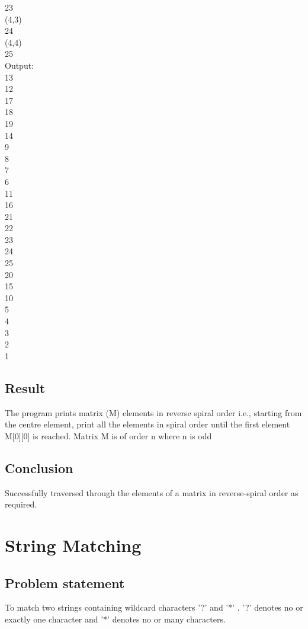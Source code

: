 \documentclass[paper=a4, fontsize=11pt]{scrartcl} %
\numberwithin{equation}{section} %
\numberwithin{figure}{section} %
\numberwithin{table}{section} %
\begin{document}
23\\
(4,3)\\
24\\
(4,4)\\
25\\
Output:\\
13\\
12\\
17\\
18\\
19\\
14\\
9\\
8\\
7\\
6\\
11\\
16\\
21\\
22\\
23\\
24\\
25\\
20\\
15\\
10\\
5\\
4\\
3\\
2\\
1\\


\subsection{Result}
The program prints matrix (M) elements in reverse spiral order i.e., starting from the centre element, print all the elements in spiral order until the first element M[0][0] is reached. Matrix M is of order n where n is odd

\subsection{Conclusion}
Successfully traversed through the elements of a matrix in reverse-spiral order as required.

\section{String Matching}

\subsection{Problem statement}
To match two strings containing wildcard characters '?' and '*' . '?' denotes no or exactly one character and '*' denotes no or many characters.
\end{document}
